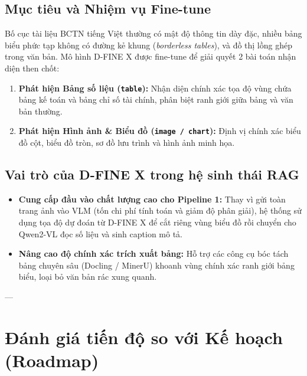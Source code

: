 \documentclass[a4paper,12pt]{article}
\begin{document}
\subsection{Mục tiêu và Nhiệm vụ Fine-tune}
Bố cục tài liệu BCTN tiếng Việt thường có mật độ thông tin dày đặc, nhiều bảng biểu phức tạp không có đường kẻ khung (\textit{borderless tables}), và đồ thị lồng ghép trong văn bản. Mô hình D-FINE X được fine-tune để giải quyết 2 bài toán nhận diện then chốt:
\begin{enumerate}
    \item \textbf{Phát hiện Bảng số liệu (\texttt{table}):} Nhận diện chính xác tọa độ vùng chứa bảng kế toán và bảng chỉ số tài chính, phân biệt ranh giới giữa bảng và văn bản thường.
    \item \textbf{Phát hiện Hình ảnh \& Biểu đồ (\texttt{image / chart}):} Định vị chính xác biểu đồ cột, biểu đồ tròn, sơ đồ lưu trình và hình ảnh minh họa.
\end{enumerate}

\subsection{Vai trò của D-FINE X trong hệ sinh thái RAG}
\begin{itemize}
    \item \textbf{Cung cấp đầu vào chất lượng cao cho Pipeline 1:} Thay vì gửi toàn trang ảnh vào VLM (tốn chi phí tính toán và giảm độ phân giải), hệ thống sử dụng tọa độ dự đoán từ D-FINE X để cắt riêng vùng biểu đồ rồi chuyển cho Qwen2-VL đọc số liệu và sinh caption mô tả.
    \item \textbf{Nâng cao độ chính xác trích xuất bảng:} Hỗ trợ các công cụ bóc tách bảng chuyên sâu (Docling / MinerU) khoanh vùng chính xác ranh giới bảng biểu, loại bỏ văn bản rác xung quanh.
\end{itemize}

---

\section{Đánh giá tiến độ so với Kế hoạch (Roadmap)}
\end{document}
